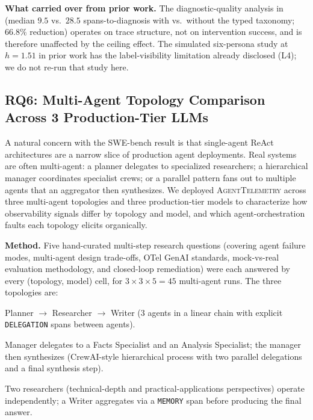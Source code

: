 \documentclass[11pt]{article}
\begin{document}
\textbf{What carried over from prior work.} The diagnostic-quality
analysis in \citet{aiware2026} (median $9.5$ vs.\ $28.5$
spans-to-diagnosis with vs.\ without the typed taxonomy; $66.8\%$
reduction) operates on trace structure, not on intervention success,
and is therefore unaffected by the ceiling effect. The simulated
six-persona study at $h{=}1.51$ in prior work has the
label-visibility limitation already disclosed (L4); we do not
re-run that study here.

\subsection{RQ6: Multi-Agent Topology Comparison Across 3 Production-Tier LLMs}
\label{sec:topology}

A natural concern with the SWE-bench result is that single-agent
ReAct architectures are a narrow slice of production agent
deployments. Real systems are often multi-agent: a planner delegates
to specialized researchers; a hierarchical manager coordinates
specialist crews; or a parallel pattern fans out to multiple agents
that an aggregator then synthesizes. We deployed
\textsc{AgentTelemetry} across three multi-agent topologies and three
production-tier models to characterize how observability signals
differ by topology and model, and which agent-orchestration faults
each topology elicits organically.

\textbf{Method.} Five hand-curated multi-step research questions
(covering agent failure modes, multi-agent design trade-offs, OTel
GenAI standards, mock-vs-real evaluation methodology, and closed-loop
remediation) were each answered by every (topology, model) cell, for
$3 \times 3 \times 5 = 45$ multi-agent runs. The three topologies are:

\begin{description}[noitemsep,topsep=2pt]
\item[Sequential.] Planner $\to$ Researcher $\to$ Writer (3 agents in
  a linear chain with explicit \texttt{DELEGATION} spans between
  agents).
\item[Hierarchical.] Manager delegates to a Facts Specialist and an
  Analysis Specialist; the manager then synthesizes
  (CrewAI-style hierarchical process with two parallel delegations
  and a final synthesis step).
\item[Parallel.] Two researchers (technical-depth and
  practical-applications perspectives) operate independently; a
  Writer aggregates via a \texttt{MEMORY} span before producing the
  final answer.
\end{description}
\end{document}
